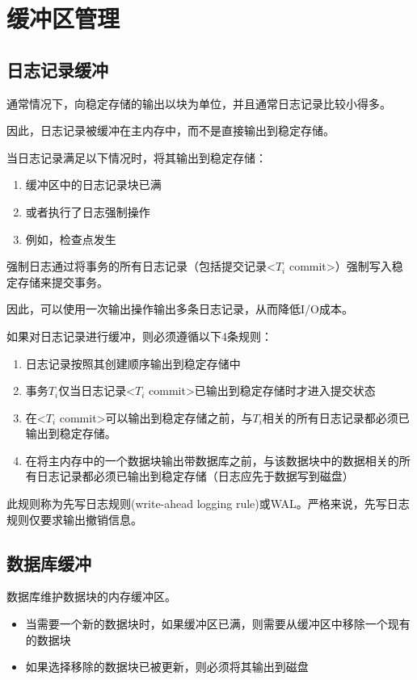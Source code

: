 \section{缓冲区管理}

\subsection{日志记录缓冲}

通常情况下，向稳定存储的输出以块为单位，并且通常日志记录比较小得多。

因此，日志记录被缓冲在主内存中，而不是直接输出到稳定存储。

当日志记录满足以下情况时，将其输出到稳定存储：
\begin{enumerate}
    \item 缓冲区中的日志记录块已满
    \item 或者执行了日志强制操作
    \item 例如，检查点发生
\end{enumerate}

强制日志通过将事务的所有日志记录（包括提交记录<$T_i$ commit>）强制写入稳定存储来提交事务。

因此，可以使用一次输出操作输出多条日志记录，从而降低I/O成本。

如果对日志记录进行缓冲，则必须遵循以下4条规则：
\begin{enumerate}
    \item 日志记录按照其创建顺序输出到稳定存储中
    \item 事务$T_i$仅当日志记录<$T_i$ commit>已输出到稳定存储时才进入提交状态
    \item 在<$T_i$ commit>可以输出到稳定存储之前，与$T_i$相关的所有日志记录都必须已输出到稳定存储。
    \item 在将主内存中的一个数据块输出带数据库之前，与该数据块中的数据相关的所有日志记录都必须已输出到稳定存储（日志应先于数据写到磁盘）
\end{enumerate}

此规则称为先写日志规则(write-ahead logging rule)或WAL。严格来说，先写日志规则仅要求输出撤销信息。

\subsection{数据库缓冲}

数据库维护数据块的内存缓冲区。
\begin{itemize}
    \item 当需要一个新的数据块时，如果缓冲区已满，则需要从缓冲区中移除一个现有的数据块
    \item 如果选择移除的数据块已被更新，则必须将其输出到磁盘
\end{itemize}


